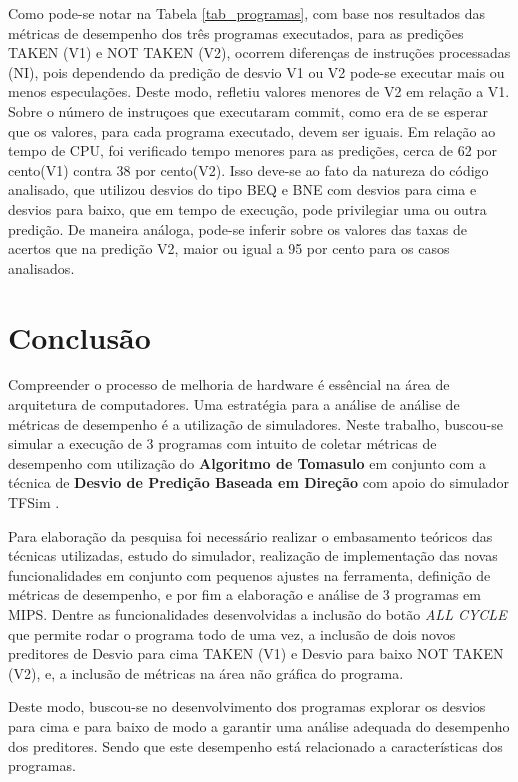 \documentclass[12pt]{article}
\begin{document}
Como pode-se notar na Tabela \ref{tab_programas}, com base nos resultados das métricas de desempenho dos três programas executados, para as predições TAKEN (V1) e NOT TAKEN (V2), ocorrem diferenças de instruções processadas (NI), pois dependendo da predição de desvio V1 ou V2 pode-se executar mais ou menos especulações. Deste modo, refletiu valores menores de V2 em relação a V1. Sobre o número de instruçoes que executaram commit, como era de se esperar que os valores, para cada programa executado, devem ser iguais. Em relação ao tempo de CPU, foi verificado tempo menores para as predições, cerca de 62 por cento(V1) contra 38 por cento(V2). Isso deve-se ao fato da natureza do código analisado, que utilizou desvios do tipo BEQ e BNE com desvios para cima e desvios para baixo, que em tempo de execução, pode privilegiar uma ou outra predição. De maneira análoga, pode-se inferir sobre os valores das taxas de acertos que na predição V2, maior ou igual a 95 por cento para os casos analisados.

\section{Conclusão}\label{sec:figs}

Compreender o processo de melhoria de hardware é essêncial na área de arquitetura de computadores. Uma estratégia para a análise de análise de métricas de desempenho é a utilização de simuladores. Neste trabalho, buscou-se simular a execução de 3 programas com intuito de coletar métricas de desempenho com utilização do \textbf{Algoritmo de Tomasulo} em conjunto com a  técnica de \textbf{Desvio de Predição Baseada em Direção} com apoio  do simulador TFSim \cite{lucas:2019}.

Para elaboração da pesquisa foi necessário realizar o embasamento teóricos das técnicas utilizadas, estudo do simulador, realização de implementação das novas funcionalidades em conjunto com pequenos ajustes na ferramenta, definição de métricas de desempenho, e por fim a elaboração e análise de 3 programas em MIPS. Dentre as funcionalidades desenvolvidas a inclusão do botão \textit{ALL CYCLE} que permite rodar o programa todo de uma vez, a inclusão de dois novos preditores  de Desvio para cima TAKEN (V1) e Desvio para baixo NOT TAKEN (V2), e, a inclusão de métricas na área não gráfica do programa.

Deste modo, buscou-se no desenvolvimento dos programas explorar os desvios para cima e para baixo de modo a garantir uma análise adequada do desempenho dos preditores. Sendo que este desempenho está relacionado a características dos programas.
\end{document}
